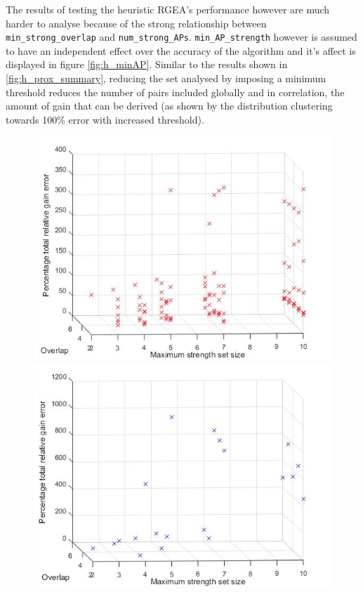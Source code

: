 \documentclass{UoYCSproject}
\begin{document}
                The results of testing the heuristic RGEA's performance however are much harder to analyse because of the strong relationship between \texttt{min\_strong\_overlap} and \texttt{num\_strong\_APs}. \texttt{min\_AP\_strength} however is assumed to have an independent effect over the accuracy of the algorithm and it's affect is displayed in figure \ref{fig:h_minAP}. Similar to the results shown in \ref{fig:h_prox_summary}, reducing the set analysed by imposing a minimum threshold reduces the number of pairs included globally and in correlation, the amount of gain that can be derived (as shown by the distribution clustering towards 100\% error with increased threshold).
                
                \begin{figure}[h]
                    \label{fig:h_overlap}
                    \centering
                    \begin{minipage}{0.5\textwidth}
                        \centering
                        \includegraphics[width=1\textwidth]{h_overlap.jpg}
                    \end{minipage}\hfill
                    \begin{minipage}{0.5\textwidth}
                        \centering
                        \includegraphics[width=1\textwidth]{h_overlap_anomalous.jpg}

\end{minipage}
\end{figure}
\end{document}
